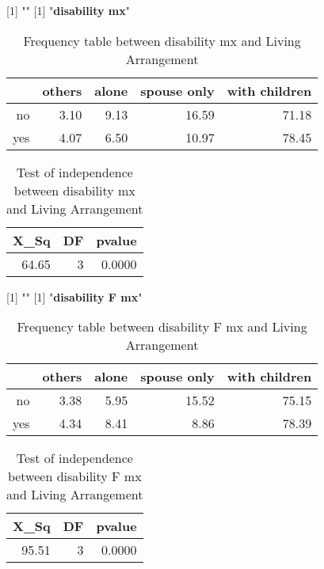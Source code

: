 \documentclass[11pt]{article}
\begin{document}
[1] "\newline"
[1] "{\bf{disability mx}}"
\begin{table}[H]
\centering
\begin{tabular}{rrrrr}
  \hline
 & others & alone & spouse only & with children \\ 
  \hline
no & 3.10 & 9.13 & 16.59 & 71.18 \\ 
  yes & 4.07 & 6.50 & 10.97 & 78.45 \\ 
   \hline
\end{tabular}
\caption{Frequency table between disability mx and Living Arrangement} 
\end{table}
\begin{table}[H]
\centering
\begin{tabular}{rrr}
  \hline
X\_Sq & DF & pvalue \\ 
  \hline
64.65 & 3 & 0.0000 \\ 
   \hline
\end{tabular}
\caption{Test of independence between disability mx and Living Arrangement} 
\end{table}
[1] "\newline"
[1] "{\bf{disability F mx}}"
\begin{table}[H]
\centering
\begin{tabular}{rrrrr}
  \hline
 & others & alone & spouse only & with children \\ 
  \hline
no & 3.38 & 5.95 & 15.52 & 75.15 \\ 
  yes & 4.34 & 8.41 & 8.86 & 78.39 \\ 
   \hline
\end{tabular}
\caption{Frequency table between disability F mx and Living Arrangement} 
\end{table}
\begin{table}[H]
\centering
\begin{tabular}{rrr}
  \hline
X\_Sq & DF & pvalue \\ 
  \hline
95.51 & 3 & 0.0000 \\ 
   \hline
\end{tabular}
\caption{Test of independence between disability F mx and Living Arrangement} 
\end{table}
\end{document}
